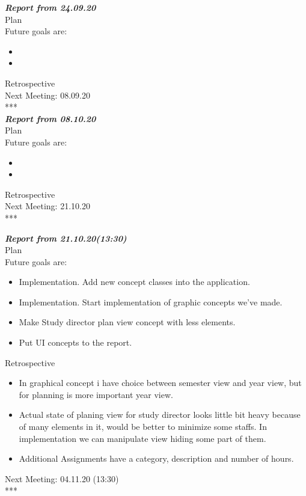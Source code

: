 \documentclass{scrartcl}
\begin{document}
\textbf{\textit{Report from 24.09.20  }}\\
Plan\\
Future goals are: 
\begin{itemize}


	\item 
	\item 
\end{itemize}	
Retrospective\\

Next Meeting: 08.09.20\\
\**** \\
\textbf{\textit{Report from 08.10.20  }}\\
Plan\\
Future goals are: 
\begin{itemize}


	\item 
	\item 
\end{itemize}	
Retrospective\\
 
Next Meeting: 21.10.20\\


\****

\textbf{\textit{Report from 21.10.20(13:30)  }}\\
Plan\\
Future goals are: 
\begin{itemize}
    \item Implementation. Add new concept classes into the application. 
  	\item  Implementation. Start implementation of graphic concepts we've made.
	\item Make Study director plan view concept with less elements.
	\item Put UI concepts to the report.
\end{itemize}	
Retrospective\\
\begin{itemize}
\item In graphical concept i have choice between semester view and year view, but for planning is more important year view.
\item Actual state of planing view for study director looks little bit heavy because of many elements in it, would be better to minimize some staffs. In implementation we can manipulate view hiding some part of them. 

\item Additional Assignments have a category, description and number of hours.

\end{itemize}
Next Meeting: 04.11.20 (13:30)\\


\****
\end{document}
